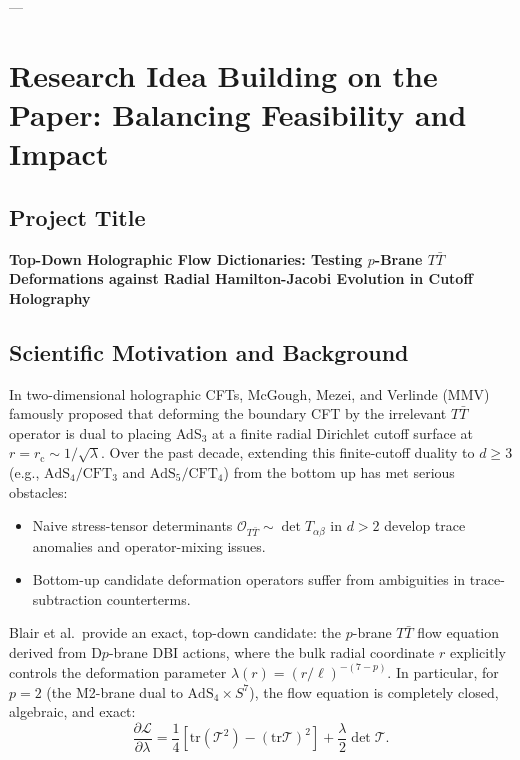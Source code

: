 \documentclass[11pt,a4paper]{article}
\begin{document}
---

\section{Research Idea Building on the Paper: Balancing Feasibility and Impact}

\subsection{Project Title}
\textbf{Top-Down Holographic Flow Dictionaries: Testing $p$-Brane $T\bar{T}$ Deformations against Radial Hamilton-Jacobi Evolution in Cutoff Holography}

\subsection{Scientific Motivation and Background}
In two-dimensional holographic CFTs, McGough, Mezei, and Verlinde (MMV) famously proposed that deforming the boundary CFT by the irrelevant $T\bar{T}$ operator is dual to placing AdS$_3$ at a finite radial Dirichlet cutoff surface at $r = r_{\text{c}} \sim 1/\sqrt{\lambda}$. Over the past decade, extending this finite-cutoff duality to $d \ge 3$ (e.g., $\text{AdS}_4/\text{CFT}_3$ and $\text{AdS}_5/\text{CFT}_4$) from the bottom up has met serious obstacles:
\begin{itemize}
    \item Naive stress-tensor determinants $\mathcal{O}_{T\bar{T}} \sim \det T_{\alpha\beta}$ in $d > 2$ develop trace anomalies and operator-mixing issues.
    \item Bottom-up candidate deformation operators suffer from ambiguities in trace-subtraction counterterms.
\end{itemize}

Blair et al.\ provide an exact, top-down candidate: the $p$-brane $T\bar{T}$ flow equation derived from D$p$-brane DBI actions, where the bulk radial coordinate $r$ explicitly controls the deformation parameter $\lambda(r) = (r/\ell)^{-(7-p)}$. In particular, for $p=2$ (the M2-brane dual to $\text{AdS}_4 \times S^7$), the flow equation is completely closed, algebraic, and exact:
\begin{equation}
    \frac{\partial \mathcal{L}}{\partial \lambda} = \frac{1}{4} \left[ \mathrm{tr}(\mathcal{T}^2) - (\mathrm{tr}\mathcal{T})^2 \right] + \frac{\lambda}{2} \det \mathcal{T}.
    \label{eq:m2flow}
\end{equation}
\end{document}
